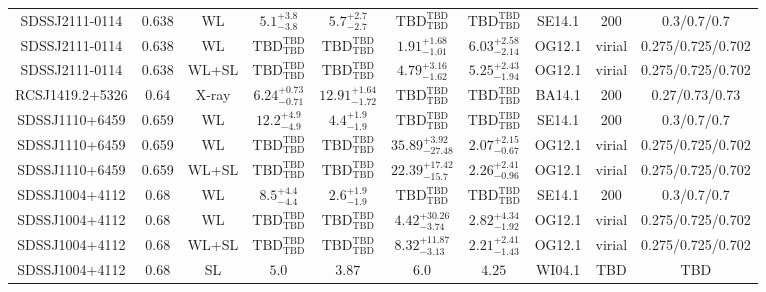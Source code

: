 \begin{table}
\begin{tabular}{cccccccccc}
SDSSJ2111-0114 & 0.638 & WL & ${5.1}^{+3.8}_{-3.8}$ & ${5.7}^{+2.7}_{-2.7}$ & ${\mathrm{TBD}}^{\mathrm{TBD}}_{\mathrm{TBD}}$ & ${\mathrm{TBD}}^{\mathrm{TBD}}_{\mathrm{TBD}}$ & SE14.1 & 200 & 0.3/0.7/0.7 \\
SDSSJ2111-0114 & 0.638 & WL & ${\mathrm{TBD}}^{\mathrm{TBD}}_{\mathrm{TBD}}$ & ${\mathrm{TBD}}^{\mathrm{TBD}}_{\mathrm{TBD}}$ & ${1.91}^{+1.68}_{-1.01}$ & ${6.03}^{+2.58}_{-2.14}$ & OG12.1 & virial & 0.275/0.725/0.702 \\
SDSSJ2111-0114 & 0.638 & WL+SL & ${\mathrm{TBD}}^{\mathrm{TBD}}_{\mathrm{TBD}}$ & ${\mathrm{TBD}}^{\mathrm{TBD}}_{\mathrm{TBD}}$ & ${4.79}^{+3.16}_{-1.62}$ & ${5.25}^{+2.43}_{-1.94}$ & OG12.1 & virial & 0.275/0.725/0.702 \\
RCSJ1419.2+5326 & 0.64 & X-ray & ${6.24}^{+0.73}_{-0.71}$ & ${12.91}^{+1.64}_{-1.72}$ & ${\mathrm{TBD}}^{\mathrm{TBD}}_{\mathrm{TBD}}$ & ${\mathrm{TBD}}^{\mathrm{TBD}}_{\mathrm{TBD}}$ & BA14.1 & 200 & 0.27/0.73/0.73 \\
SDSSJ1110+6459 & 0.659 & WL & ${12.2}^{+4.9}_{-4.9}$ & ${4.4}^{+1.9}_{-1.9}$ & ${\mathrm{TBD}}^{\mathrm{TBD}}_{\mathrm{TBD}}$ & ${\mathrm{TBD}}^{\mathrm{TBD}}_{\mathrm{TBD}}$ & SE14.1 & 200 & 0.3/0.7/0.7 \\
SDSSJ1110+6459 & 0.659 & WL & ${\mathrm{TBD}}^{\mathrm{TBD}}_{\mathrm{TBD}}$ & ${\mathrm{TBD}}^{\mathrm{TBD}}_{\mathrm{TBD}}$ & ${35.89}^{+3.92}_{-27.48}$ & ${2.07}^{+2.15}_{-0.67}$ & OG12.1 & virial & 0.275/0.725/0.702 \\
SDSSJ1110+6459 & 0.659 & WL+SL & ${\mathrm{TBD}}^{\mathrm{TBD}}_{\mathrm{TBD}}$ & ${\mathrm{TBD}}^{\mathrm{TBD}}_{\mathrm{TBD}}$ & ${22.39}^{+17.42}_{-15.7}$ & ${2.26}^{+2.41}_{-0.96}$ & OG12.1 & virial & 0.275/0.725/0.702 \\
SDSSJ1004+4112 & 0.68 & WL & ${8.5}^{+4.4}_{-4.4}$ & ${2.6}^{+1.9}_{-1.9}$ & ${\mathrm{TBD}}^{\mathrm{TBD}}_{\mathrm{TBD}}$ & ${\mathrm{TBD}}^{\mathrm{TBD}}_{\mathrm{TBD}}$ & SE14.1 & 200 & 0.3/0.7/0.7 \\
SDSSJ1004+4112 & 0.68 & WL & ${\mathrm{TBD}}^{\mathrm{TBD}}_{\mathrm{TBD}}$ & ${\mathrm{TBD}}^{\mathrm{TBD}}_{\mathrm{TBD}}$ & ${4.42}^{+30.26}_{-3.74}$ & ${2.82}^{+4.34}_{-1.92}$ & OG12.1 & virial & 0.275/0.725/0.702 \\
SDSSJ1004+4112 & 0.68 & WL+SL & ${\mathrm{TBD}}^{\mathrm{TBD}}_{\mathrm{TBD}}$ & ${\mathrm{TBD}}^{\mathrm{TBD}}_{\mathrm{TBD}}$ & ${8.32}^{+11.87}_{-3.13}$ & ${2.21}^{+2.41}_{-1.43}$ & OG12.1 & virial & 0.275/0.725/0.702 \\
SDSSJ1004+4112 & 0.68 & SL & ${5.0}^{}_{}$ & ${3.87}^{}_{}$ & ${6.0}^{}_{}$ & ${4.25}^{}_{}$ & WI04.1 & TBD & TBD \\

\end{tabular}
\end{table}
